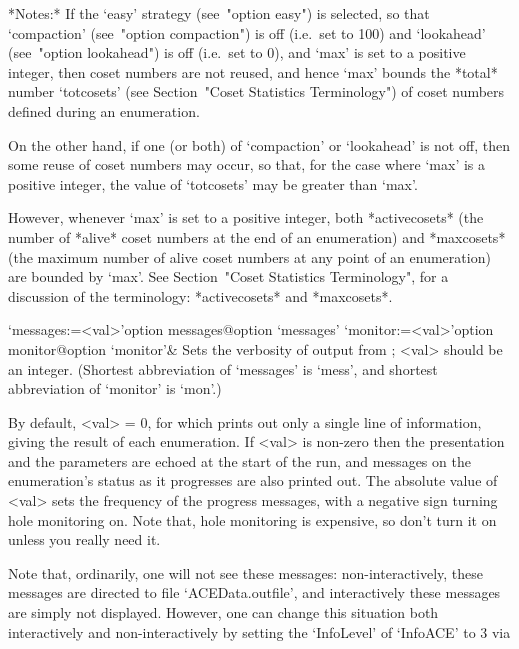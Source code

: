 *Notes:*
If the `easy'  strategy  (see~"option  easy")  is  selected,  so  that
`compaction' (see~"option compaction") is off (i.e.~set  to  100)  and
`lookahead' (see~"option lookahead") is off (i.e.~set to 0), and `max'
is set to a positive integer, then coset numbers are not  reused,  and
hence `max' bounds the *total* number `totcosets' (see  Section~"Coset
Statistics  Terminology")  of  coset   numbers   defined   during   an
enumeration.

On the other hand, if one (or both) of `compaction' or `lookahead'  is
not off, then some reuse of coset numbers may occur, so that, for  the
case where `max' is a positive integer, the value of  `totcosets'  may
be greater than `max'.

However,  whenever  `max'  is  set  to  a   positive   integer,   both
*activecosets* (the number of *alive* coset numbers at the end  of  an
enumeration) and  *maxcosets*  (the  maximum  number  of  alive  coset
numbers at any point of an enumeration)  are  bounded  by  `max'.  See
Section~"Coset  Statistics  Terminology",  for  a  discussion  of  the
terminology: *activecosets* and *maxcosets*.

\enditems


\beginitems

\>`messages:=<val>'{option messages}@{option `messages'}
\>`monitor:=<val>'{option monitor}@{option `monitor'}&
Sets the verbosity of output from {\ACE}; <val> should be an integer.
(Shortest  abbreviation  of  `messages'  is   `mess',   and   shortest
abbreviation of `monitor' is `mon'.)

By default, <val> = 0, for which {\ACE} prints out only a single  line
of information, giving the result of each  enumeration.  If  <val>  is
non-zero then the presentation and the parameters are  echoed  at  the
start of the run, and messages  on  the  enumeration's  status  as  it
progresses are also printed out. The absolute value of <val> sets  the
frequency of the progress messages, with a negative sign turning  hole
monitoring on. Note that, hole monitoring is expensive, so don't  turn
it on unless you really need it.

Note   that,  ordinarily,  one   will   not   see   these    messages:
non-interactively,   these   messages    are    directed    to    file
`ACEData.outfile', and interactively  these
messages are simply  not  displayed.  However,  one  can  change  this
situation both interactively and   non-interactively  by  setting  the
`InfoLevel' of `InfoACE' to 3 via

